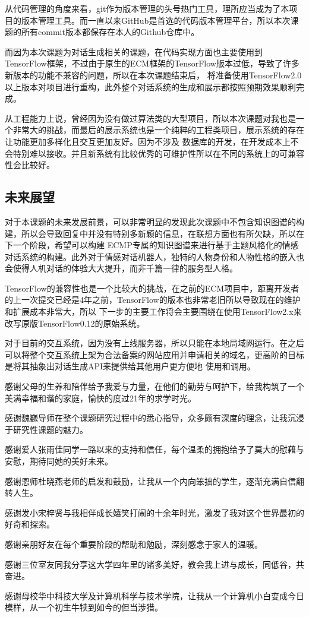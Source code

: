 \documentclass[supercite]{HustGraduPaper}
\theoremstyle{definition}
\begin{document}
从代码管理的角度来看，git作为版本管理的头号热门工具，理所应当成为了本项目的版本管理工具。而一直以来GitHub是首选的代码版本管理平台，所以本次课题的所有commit版本都保存在本人的Github仓库中。

而因为本次课题为对话生成相关的课题，在代码实现方面也主要使用到TensorFlow框架，不过由于原生的ECM框架的TensorFlow版本过低，导致了许多新版本的功能不兼容的问题，所以在本次课题结束后，
将准备使用TensorFlow2.0以上版本对项目进行重构，此外整个对话系统的生成和展示都按照预期效果顺利完成。

从工程能力上说，曾经因为没有做过算法类的大型项目，所以本次课题对我也是一个非常大的挑战，而最后的展示系统也是一个纯粹的工程类项目，展示系统的存在让功能更加多样化且交互更加友好。因为不涉及
数据库的开发，在开发成本上不会特别难以接收。并且新系统有比较优秀的可维护性所以在不同的系统上的可兼容性会比较好。

\subsection{未来展望}
对于本课题的未来发展前景，可以非常明显的发现此次课题中不包含知识图谱的构建，所以会导致回复中并没有特别多新颖的信息，在联想方面也有所欠缺，所以在下一个阶段，希望可以构建
ECMP专属的知识图谱来进行基于主题风格化的情感对话系统的构建。此外对于情感对话机器人，独特的人物身份和人物性格的嵌入也会使得人机对话的体验大大提升，而非千篇一律的服务型人格。

TensorFlow的兼容性也是一个比较大的挑战，在之前的ECM项目中，距离开发者的上一次提交已经是4年之前，TensorFlow的版本也非常老旧所以导致现在的维护和扩展成本非常大，所以
下一步的主要工作将会主要围绕在使用TensorFlow2.x来改写原版TensorFlow0.12的原始系统。

对于目前的交互系统，因为没有上线服务器，所以只能在本地局域网运行。在之后可以将整个交互系统上架为合法备案的网站应用并申请相关的域名，更高阶的目标是将其抽象出对话生成API来提供给其他用户更方便地
使用和调用。


\begin{thankpage}
感谢父母的生养和陪伴给予我爱与力量，在他们的勤劳与呵护下，给我构筑了一个美满幸福和谐的家庭，愉快的度过21年的求学时光。

感谢魏巍导师在整个课题研究过程中的悉心指导，众多颇有深度的理念，让我沉浸于研究性课题的魅力。

感谢爱人张雨佳同学一路以来的支持和信任，每个温柔的拥抱给予了莫大的慰藉与安慰，期待同她的美好未来。

感谢恩师杜晓燕老师的启发和鼓励，让我从一个内向笨拙的学生，逐渐充满自信翻转人生。

感谢发小宋梓贤与我相伴成长嬉笑打闹的十余年时光，激发了我对这个世界最初的好奇和探索。

感谢亲朋好友在每个重要阶段的帮助和勉励，深刻感念于家人的温暖。

感谢三位室友同我分享这大学四年里的诸多美好，教会我上进与成长，同低谷，共奋进。

感谢母校华中科技大学及计算机科学与技术学院，让我从一个计算机小白变成今日模样，从一个初生牛犊到如今的但当涉猎。

\end{thankpage}

\nocite{*}


\end{document}
